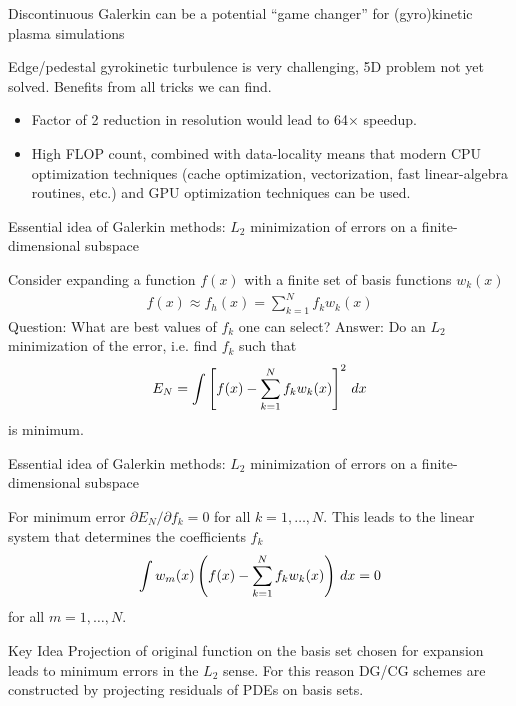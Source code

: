 \documentclass[pdf]{beamer}
\newcommand{\mypause}{}
\theoremstyle{definition}
\begin{document}
\begin{frame}{Discontinuous Galerkin can be a potential ``game
    changer'' for (gyro)kinetic plasma simulations}
  
  Edge/pedestal gyrokinetic turbulence is very challenging, 5D problem
  not yet solved. Benefits from all tricks we can find.
  \begin{itemize}
  \item Factor of 2 reduction in resolution would lead to 64$\times$
    speedup.
  \item High FLOP count, combined with data-locality means that modern
    CPU optimization techniques (cache optimization, vectorization,
    fast linear-algebra routines, etc.) and GPU optimization
    techniques can be used.
  \end{itemize}

\end{frame}

\begin{frame}{Essential idea of Galerkin methods: $L_2$ minimization
    of errors on a finite-dimensional subspace}

  Consider expanding a function $f(x)$ with a finite set of basis
  functions $w_k(x)$
  \begin{align*}
    f(x) \approx f_h(x)  = \sum_{k=1}^N f_k w_k(x)
  \end{align*}
  Question: What are best values of $f_k$ one can select?  \mypause
  Answer: Do an $L_2$ minimization of the error, i.e. find $f_k$ such
  that
  \begin{align*}
    E_N = \int \left[
      f(x) - \sum_{k=1}^N f_k w_k(x)\right]^2\thinspace dx
  \end{align*}
  is minimum.

\end{frame}

\begin{frame}{Essential idea of Galerkin methods: $L_2$ minimization
    of errors on a finite-dimensional subspace}

  For minimum error $\partial E_N/\partial f_k = 0$ for all
  $k=1,\ldots,N$. This leads to the linear system that determines the
  coefficients $f_k$
  \begin{align*}
    \int w_m(x) \left(
      f(x) - \sum_{k=1}^N f_k w_k(x)
    \right)\thinspace dx = 0
  \end{align*}
  for all $m=1,\ldots,N$.
  \mypause
  \begin{block}{Key Idea}
    Projection of original function on the basis set chosen for
    expansion leads to minimum errors in the $L_2$ sense. For this
    reason DG/CG schemes are constructed by projecting residuals of
    PDEs on basis sets.
  \end{block}

\end{frame}
\end{document}
